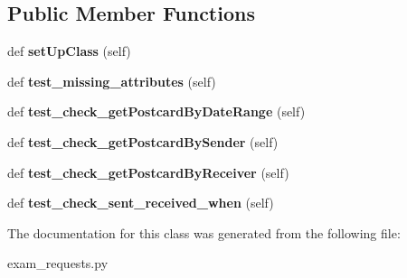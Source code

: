 \subsection*{Public Member Functions}
\begin{DoxyCompactItemize}
\item 
\mbox{\label{classexam__requests_1_1Test_a4b49b382c3d0e236ddf182a0626680e0}} 
def {\bfseries set\+Up\+Class} (self)
\item 
\mbox{\label{classexam__requests_1_1Test_a6f8a529d2e049347f473e2230b209caf}} 
def {\bfseries test\+\_\+missing\+\_\+attributes} (self)
\item 
\mbox{\label{classexam__requests_1_1Test_a7f8ffc06f47c83bde84328ff3e243289}} 
def {\bfseries test\+\_\+check\+\_\+get\+Postcard\+By\+Date\+Range} (self)
\item 
\mbox{\label{classexam__requests_1_1Test_a806d83fb58870c103f597fcb5141e8a6}} 
def {\bfseries test\+\_\+check\+\_\+get\+Postcard\+By\+Sender} (self)
\item 
\mbox{\label{classexam__requests_1_1Test_a7249282e90a7bf67fe9a1c31938c9dca}} 
def {\bfseries test\+\_\+check\+\_\+get\+Postcard\+By\+Receiver} (self)
\item 
\mbox{\label{classexam__requests_1_1Test_a61ad7484e9405b949dd4e4095bab87c0}} 
def {\bfseries test\+\_\+check\+\_\+sent\+\_\+received\+\_\+when} (self)
\end{DoxyCompactItemize}


The documentation for this class was generated from the following file\+:\begin{DoxyCompactItemize}
\item 
exam\+\_\+requests.\+py\end{DoxyCompactItemize}

